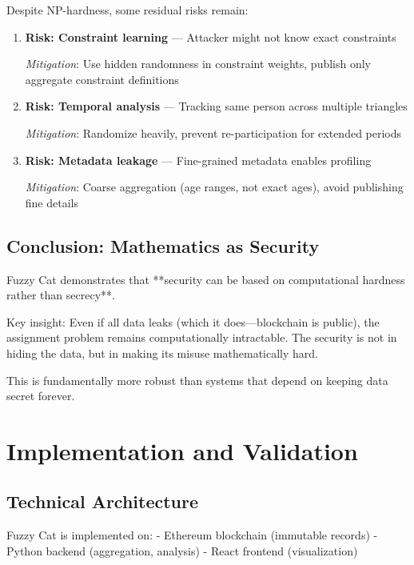 \documentclass[12pt,a4paper]{article}
\theoremstyle{definition}
\begin{document}
{Despite NP-hardness, some residual risks remain:

\begin{enumerate}
    \item \textbf{Risk: Constraint learning} — Attacker might not know exact constraints
    
    \textit{Mitigation}: Use hidden randomness in constraint weights, publish only aggregate constraint definitions
    
    \item \textbf{Risk: Temporal analysis} — Tracking same person across multiple triangles
    
    \textit{Mitigation}: Randomize heavily, prevent re-participation for extended periods
    
    \item \textbf{Risk: Metadata leakage} — Fine-grained metadata enables profiling
    
    \textit{Mitigation}: Coarse aggregation (age ranges, not exact ages), avoid publishing fine details
\end{enumerate}

\subsection{Conclusion: Mathematics as Security}

Fuzzy Cat demonstrates that **security can be based on computational hardness rather than secrecy**.

Key insight: Even if all data leaks (which it does—blockchain is public), the assignment problem remains computationally intractable. The security is not in hiding the data, but in making its misuse mathematically hard.

This is fundamentally more robust than systems that depend on keeping data secret forever.

\section{Implementation and Validation}

\subsection{Technical Architecture}

Fuzzy Cat is implemented on:
- Ethereum blockchain (immutable records)
- Python backend (aggregation, analysis)
- React frontend (visualization)

}
\end{document}
